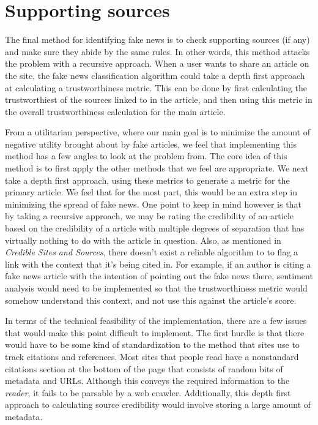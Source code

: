 \documentclass[12pt]{article}
\begin{document}
\section{Supporting sources}
The final method for identifying fake news is to check supporting sources (if any) and make sure they abide by the same rules. In other words, this method attacks the problem with a recursive approach. When a user wants to share an article on the site, the fake news classification algorithm could take a depth first approach at calculating a trustworthiness metric. This can be done by first calculating the trustworthiest of the sources linked to in the article, and then using this metric in the overall trustworthiness calculation for the main article.

From a utilitarian perspective, where our main goal is to minimize the amount of negative utility brought about by fake articles, we feel that implementing this method has a few angles to look at the problem from. The core idea of this method is to first apply the other methods that we feel are appropriate. We next take a depth first approach, using these metrics to generate a metric for the primary article. We feel that for the most part, this would be an extra step in minimizing the spread of fake news. One point to keep in mind however is that by taking a recursive approach, we may be rating the credibility of an article based on the credibility of a article with multiple degrees of separation that has virtually nothing to do with the article in question. Also, as mentioned in \textit{Credible Sites and Sources}, there doesn't exist a reliable algorithm to to flag a link with the context that it's being cited in. For example, if an author is citing a fake news article with the intention of pointing out the fake news there, sentiment analysis would need to be implemented so that the trustworthiness metric would somehow understand this context, and not use this against the article's score.

In terms of the technical feasibility of the implementation, there are a few issues that would make this point difficult to implement. The first hurdle is that there would have to be some kind of standardization to the method that sites use to track citations and references. Most sites that people read have a nonstandard citations section at the bottom of the page that consists of random bits of metadata and URLs. Although this conveys the required information to the \textit{reader}, it fails to be parsable by a web crawler. Additionally, this depth first approach to calculating source credibility would involve storing a large amount of metadata.
\end{document}

